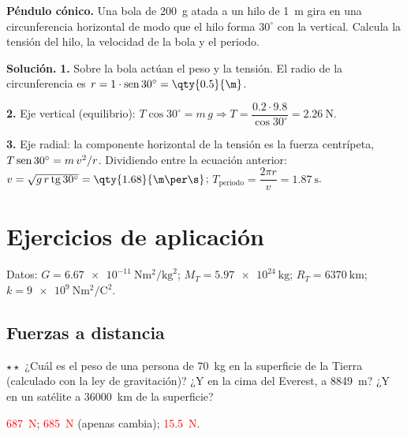\begin{example}
    \textbf{Péndulo cónico.} Una bola de \qty{200}{\g} atada a un hilo de \qty{1}{\m} gira en una circunferencia horizontal de modo
    que el hilo forma \(30^\circ\) con la vertical. Calcula la tensión del hilo, la velocidad de la bola y el periodo.

    \textbf{Solución.} \textbf{1.} Sobre la bola actúan el peso y la tensión. El radio de la circunferencia es \(r = 1 \cdot \sen 30^\circ
    = \qty{0.5}{\m}\).

    \textbf{2.} Eje vertical (equilibrio): \(T\cos 30^\circ = m\,g \Rightarrow T = \dfrac{\num{0.2} \cdot \num{9.8}}{\cos 30^\circ} = \qty{2.26}{\newton}\).

    \textbf{3.} Eje radial: la componente horizontal de la tensión es la fuerza centrípeta, \(T\operatorname{sen} 30^\circ = m\,v^2/r\). Dividiendo
    entre la ecuación anterior: \(v = \sqrt{g\,r\tg 30^\circ} = \qty{1.68}{\m\per\s}\); \(T_{\text{periodo}} = \dfrac{2\pi r}{v} = \qty{1.87}{\s}\).
\end{example}

\section{Ejercicios de aplicación}\label{sec:ud11-aplicacion}

Datos: \(G = \qty{6.67e-11}{\newton\m\squared\per\kg\squared}\); \(M_T = \qty{5.97e24}{\kg}\); \(R_T = \qty{6370}{\km}\);
\(k = \qty{9e9}{\newton\m\squared\per\coulomb\squared}\).

\subsection{Fuerzas a distancia}

\begin{exercise}
    \(\star\star\) ¿Cuál es el peso de una persona de \qty{70}{\kg} en la superficie de la Tierra (calculado con la ley de gravitación)?
    ¿Y en la cima del Everest, a \qty{8849}{\m}? ¿Y en un satélite a \qty{36000}{\km} de la superficie?
    \begin{solu}
        \textcolor{red}{\qty{687}{\newton}}; \textcolor{red}{\qty{685}{\newton}} (apenas cambia); \textcolor{red}{\qty{15.5}{\newton}}.
    \end{solu}
\end{exercise}

